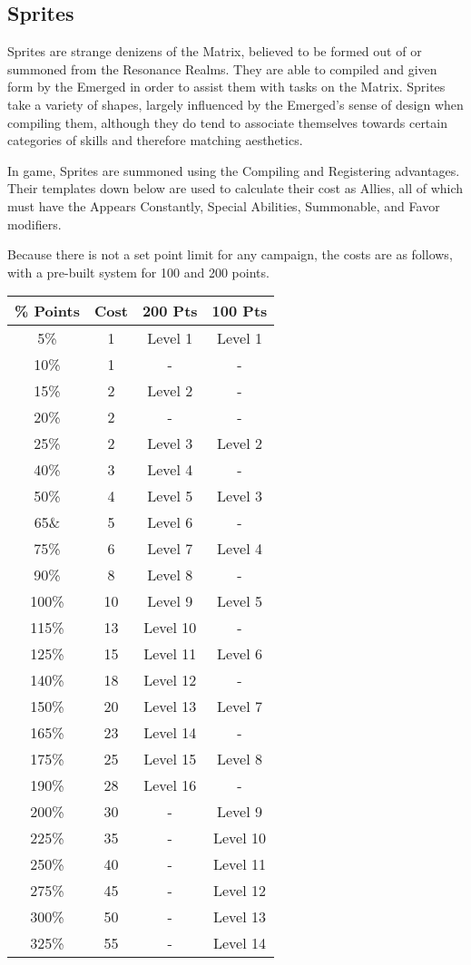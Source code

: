 \begin{multicols*}{3}
\subsection{Sprites}

Sprites are strange denizens of the Matrix, believed to be formed out of or summoned from the Resonance Realms. They are able to compiled and given form by the Emerged in order to assist them with tasks on the Matrix. Sprites take a variety of shapes, largely influenced by the Emerged's sense of design when compiling them, although they do tend to associate themselves towards certain categories of skills and therefore matching aesthetics.

In game, Sprites are summoned using the Compiling and Registering advantages. Their templates down below are used to calculate their cost as Allies, all of which must have the Appears Constantly, Special Abilities, Summonable, and Favor modifiers.

Because there is not a set point limit for any campaign, the costs are as follows, with a pre-built system for 100 and 200 points.

	\begin{center} \label{sprite_ally_cost}
	\begin{tabular}{|c|c|c|c|}
		\hline
		\% Points & Cost & 200 Pts & 100 Pts\\
		\hline
		\hline
		5\% & 1 & Level 1 & Level 1 \\
		10\% & 1 & - & - \\
		15\% & 2 & Level 2 & - \\
		20\% & 2 & - & - \\
		25\% & 2 & Level 3 & Level 2 \\
		40\% & 3 & Level 4 & - \\
		50\% & 4 & Level 5 & Level 3 \\
		65\& & 5 & Level 6 & - \\
		75\% & 6 & Level 7 & Level 4 \\
		90\% & 8 & Level 8 & - \\
		100\% & 10 & Level 9 & Level 5 \\
		115\% & 13 & Level 10 & - \\
		125\% & 15 & Level 11 & Level 6 \\
		140\% & 18 & Level 12 & - \\
		150\% & 20 & Level 13 & Level 7 \\
		165\% & 23 & Level 14 & - \\
		175\% & 25 & Level 15 & Level 8 \\
		190\% & 28 & Level 16 & - \\
		200\% & 30 & - & Level 9 \\
		225\% & 35 & - & Level 10 \\
		250\% & 40 & - & Level 11 \\
		275\% & 45 & - & Level 12 \\
		300\% & 50 & - & Level 13 \\
		325\% & 55 & - & Level 14 \\
		\hline
	\end{tabular}
\end{center}


\end{multicols*}

